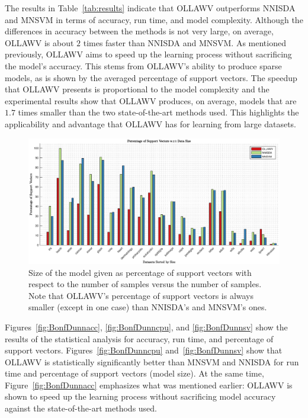 \documentclass[reqno]{vcuthesis}
\numberwithin{equation}{chapter}
\begin{document}
The results in Table~\ref{tab:results} indicate that OLLAWV outperforms NNISDA and MNSVM in terms of accuracy, run time, and model complexity. Although the differences in accuracy between the methods is not very large, on average, OLLAWV is about $2$ times faster than NNISDA and MNSVM. As mentioned previously, OLLAWV aims to speed up the learning process without sacrificing the model's accuracy. This stems from OLLAWV's ability to produce sparse models, as is shown by the averaged percentage of support vectors. The speedup that OLLAWV presents is proportional to the model complexity and the experimental results show that OLLAWV produces, on average, models that are $1.7$ times smaller than the two state-of-the-art methods used. This highlights the applicability and advantage that OLLAWV has for learning from large datasets. 

\begin{figure}[t!]
\centering
\includegraphics[trim={3.2cm 0 3.2cm 0},clip,width=\textwidth]{figures/PSV_vs_NumData.eps}
\caption{\small Size of the model given as percentage of support vectors with respect to the number of samples  versus the number of samples. Note that OLLAWV’s percentage of support vectors is always smaller (except in one case) than NNISDA's and MNSVM's ones.}
\label{fig:psvvssamples}
\end{figure}
Figures~\ref{fig:BonfDunnacc}, \ref{fig:BonfDunncpu}, and \ref{fig:BonfDunnsv} show the results of the statistical analysis for accuracy, run time, and percentage of support vectors. Figures~\ref{fig:BonfDunncpu} and~\ref{fig:BonfDunnsv} show that OLLAWV is statistically significantly better than MNSVM and NNISDA for run time and percentage of support vectors (model size). At the same time, Figure~\ref{fig:BonfDunnacc} emphasizes what was mentioned earlier: OLLAWV is shown to speed up the learning process without sacrificing model accuracy against the state-of-the-art methods used. 
\end{document}
